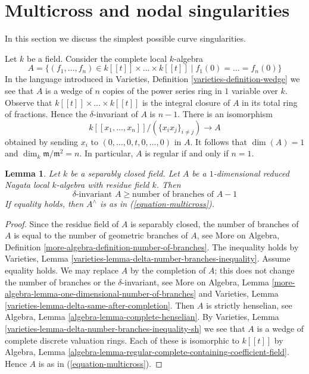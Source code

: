 \documentclass{stacks-project}
\theoremstyle{plain}
\newtheorem{lemma}[subsection]{Lemma}
\theoremstyle{definition}
\theoremstyle{remark}
\numberwithin{equation}{subsection}
\begin{document}
\section{Multicross and nodal singularities}
\label{section-multicross}

\noindent
In this section we discuss the simplest possible curve singularities.

\medskip\noindent
Let $k$ be a field. Consider the complete local $k$-algebra
\begin{equation}
\label{equation-multicross}
A = \{(f_1, \ldots, f_n) \in k[[t]] \times \ldots \times k[[t]] \mid
f_1(0) = \ldots = f_n(0)\}
\end{equation}
In the language introduced in
Varieties, Definition \ref{varieties-definition-wedge}
we see that $A$ is a wedge of $n$ copies of the power series
ring in $1$ variable over $k$. Observe that
$k[[t]] \times \ldots \times k[[t]]$
is the integral closure of $A$ in its total ring of fractions.
Hence the $\delta$-invariant of $A$ is $n - 1$.
There is an isomorphism
$$
k[[x_1, \ldots, x_n]]/(\{x_ix_j\}_{i \not = j}) \longrightarrow A
$$
obtained by sending $x_i$ to $(0, \ldots, 0, t, 0, \ldots, 0)$
in $A$. It follows that $\dim(A) = 1$ and
$\dim_k \mathfrak m/\mathfrak m^2 = n$.
In particular, $A$ is regular if and only if $n = 1$.

\begin{lemma}
\label{lemma-multicross-algebra}
Let $k$ be a separably closed field. Let $A$ be a $1$-dimensional
reduced Nagata local $k$-algebra with residue field $k$. Then
$$
\delta\text{-invariant }A \geq \text{number of branches of }A - 1
$$
If equality holds, then $A^\wedge$ is as in (\ref{equation-multicross}).
\end{lemma}

\begin{proof}
Since the residue field of $A$ is separably closed, the number
of branches of $A$ is equal to the number of geometric branches
of $A$, see
More on Algebra, Definition \ref{more-algebra-definition-number-of-branches}.
The inequality holds by
Varieties, Lemma \ref{varieties-lemma-delta-number-branches-inequality}.
Assume equality holds.
We may replace $A$ by the completion of $A$; this does
not change the number of branches or the $\delta$-invariant, see
More on Algebra, Lemma
\ref{more-algebra-lemma-one-dimensional-number-of-branches}
and Varieties, Lemma \ref{varieties-lemma-delta-same-after-completion}.
Then $A$ is strictly henselian, see
Algebra, Lemma \ref{algebra-lemma-complete-henselian}.
By Varieties, Lemma \ref{varieties-lemma-delta-number-branches-inequality-sh}
we see that $A$ is a wedge of complete discrete valuation rings.
Each of these is isomorphic to $k[[t]]$ by Algebra, Lemma
\ref{algebra-lemma-regular-complete-containing-coefficient-field}.
Hence $A$ is as in (\ref{equation-multicross}).
\end{proof}
\end{document}
